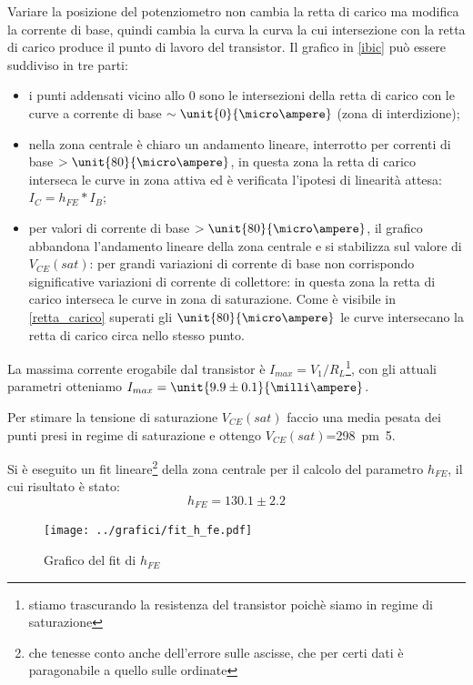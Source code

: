 \documentclass[10pt,a4paper]{article}
\begin{document}
Variare la posizione del potenziometro non cambia la retta di carico ma modifica la corrente di base, quindi cambia la curva la curva la cui intersezione con la retta di carico produce il punto di lavoro del transistor.
Il grafico in \figurename{\ref{ibic}} può essere suddiviso in tre parti:
\begin{itemize}
	\item i punti addensati vicino allo $0$ sono le intersezioni della retta di carico con le curve a corrente di base $\sim \unit{ 0}{\micro\ampere}$ (zona di interdizione);
	\item nella zona centrale è chiaro un andamento lineare, interrotto per correnti di base $>\unit{80}{\micro\ampere}$, in questa zona la retta di carico interseca le curve in zona attiva ed è verificata l'ipotesi di linearità attesa: $I_C = h_{FE}*I_B$;
	\item per valori di corrente di base $>\unit{80}{\micro\ampere}$, il grafico abbandona l'andamento lineare della zona centrale e si stabilizza sul valore di $V_{CE}(sat)$: per grandi variazioni di corrente di base non corrispondo significative variazioni di corrente di collettore: in questa zona la retta di carico interseca le curve in zona di saturazione. Come è visibile in \figurename{\ref{retta_carico}} superati gli $\unit{80}{\micro\ampere}$ le curve intersecano la retta di carico circa nello stesso punto.
\end{itemize}
La massima corrente erogabile dal transistor è $I_{max}=V_1/R_L$\footnote{stiamo trascurando la resistenza del transistor poichè siamo in regime di saturazione}, con gli attuali parametri otteniamo $I_{max}=\unit{9.9 \pm 0.1}{\milli\ampere}$. 

Per stimare la tensione di saturazione $V_{CE}(sat)$ faccio una media pesata dei punti presi in regime di saturazione e ottengo $V_{CE}(sat)$=\unit{298 \pm 5}{\milli\volt}.

Si è eseguito un fit lineare\footnote{che tenesse conto anche dell'errore sulle ascisse, che per certi dati è paragonabile a quello sulle ordinate} della zona centrale per il calcolo del parametro $h_{FE}$, il cui risultato è stato:
\begin{equation*}
h_{FE} = 130.1 \pm 2.2
\end{equation*}
\begin{figure}[h!]
	\centering
	\texttt{[image: ../grafici/fit\_h\_fe.pdf]}
	\caption{Grafico del fit di $h_{FE}$}
\end{figure}
\end{document}
